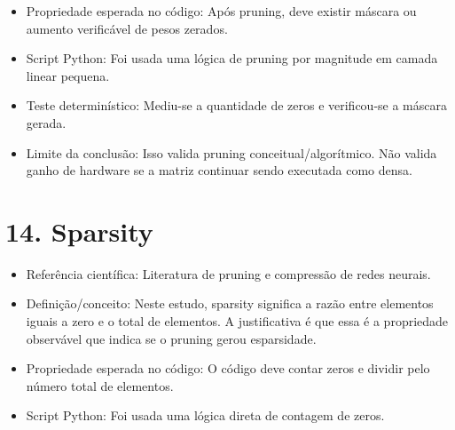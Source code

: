 \begin{itemize}
\item Propriedade esperada no código:
Após pruning, deve existir máscara ou aumento verificável de pesos zerados.
\end{itemize}

\begin{itemize}
\item Script Python:
Foi usada uma lógica de pruning por magnitude em camada linear pequena.
\end{itemize}

\begin{itemize}
\item Teste determinístico:
Mediu-se a quantidade de zeros e verificou-se a máscara gerada.
\end{itemize}

\begin{itemize}
\item Limite da conclusão:
Isso valida pruning conceitual/algorítmico. Não valida ganho de hardware se a
matriz continuar sendo executada como densa.
\end{itemize}



\section{14. Sparsity}


\begin{itemize}
\item Referência científica:
Literatura de pruning e compressão de redes neurais.
\end{itemize}

\begin{itemize}
\item Definição/conceito:
Neste estudo, sparsity significa a razão entre elementos iguais a zero e o
total de elementos. A justificativa é que essa é a propriedade observável que
indica se o pruning gerou esparsidade.
\end{itemize}

\begin{itemize}
\item Propriedade esperada no código:
O código deve contar zeros e dividir pelo número total de elementos.
\end{itemize}

\begin{itemize}
\item Script Python:
Foi usada uma lógica direta de contagem de zeros.
\end{itemize}

